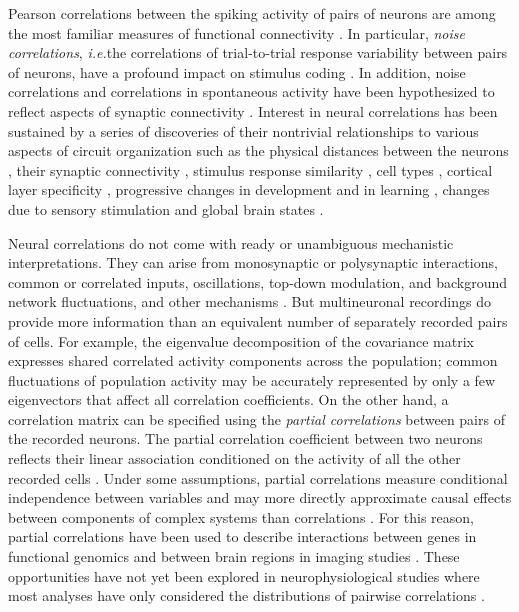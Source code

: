 \documentclass[10pt]{article}
\newcommand{\ie}{\emph{i.e.}\;}
\begin{document}
Pearson correlations between the spiking activity of pairs of neurons are among the most familiar measures of functional connectivity \cite{Averbeck:2006, Zohary:1994, Kohn:2005, Bair:2001, Ecker:2010}.  In particular, \emph{noise correlations}, \ie the correlations of trial-to-trial response variability between pairs of neurons, have a profound impact on stimulus coding \cite{Zohary:1994, Abbott:1999, Sompolinsky:2001, Nirenberg:2003, Averbeck:2006, Josic:2009, Berens:2011, Ecker:2011}. In addition, noise correlations and correlations in spontaneous activity have been hypothesized to reflect aspects of synaptic connectivity \cite{Gerstein:1964}.  Interest in neural correlations has been sustained by a series of discoveries of their nontrivial relationships to various aspects of circuit organization such as the physical distances between the neurons \cite{Smith:2008, Denman:2013}, their synaptic connectivity \cite{Ko:2011},  stimulus response similarity \cite{Bair:2001, Arieli:1995, Chiu:2002, Kenet:2003, Kohn:2005, Cohen:2008, Cohen:2009, Ecker:2010, Rothschild:2010, Ko:2011, Smith:2013b}, cell types \cite{Hofer:2011}, cortical layer specificity \cite{Hansen:2012, Smith:2013}, progressive changes in development and in learning \cite{Golshani:2009, Gu:2011, Ko:2013}, changes due to sensory stimulation and global brain states \cite{Greenberg:2008, Goard:2009, Kohn:2009, Rothschild:2010, Ecker:2010, Renart:2010}. 

Neural correlations do not come with ready or unambiguous mechanistic interpretations. They can arise from monosynaptic or polysynaptic interactions, common or correlated inputs, oscillations, top-down modulation, and background network fluctuations, and other mechanisms \cite{Perkel:1967, Moore:1970, Shadlen:1998, Salinas:2001, Ostojic:2009, Rosenbaum:2011}. But multineuronal recordings do provide more information than an equivalent number of separately recorded pairs of cells. For example, the eigenvalue decomposition of the covariance matrix expresses shared correlated activity components across the population; common fluctuations of population activity may be accurately represented by only a few eigenvectors that affect all correlation coefficients. On the other hand, a correlation matrix can be specified using the \emph{partial correlations} between pairs of the recorded neurons. The partial correlation coefficient between two neurons reflects their linear association conditioned on the activity of all the other recorded cells \cite{Whittaker:1990}.  Under some assumptions, partial correlations measure conditional independence between variables and may more directly approximate causal effects between components of complex systems than correlations \cite{Whittaker:1990}. For this reason, partial correlations have been used to describe interactions between genes in functional genomics \cite{Schafer:2005, Peng:2009} and between brain regions in imaging studies \cite{Varoquaux:2012, Ryali:2012}. These opportunities have not yet been explored in neurophysiological studies where most analyses have only considered the distributions of pairwise correlations \cite{Zohary:1994, Bair:2001, Smith:2008, Ecker:2010}. 
\end{document}
